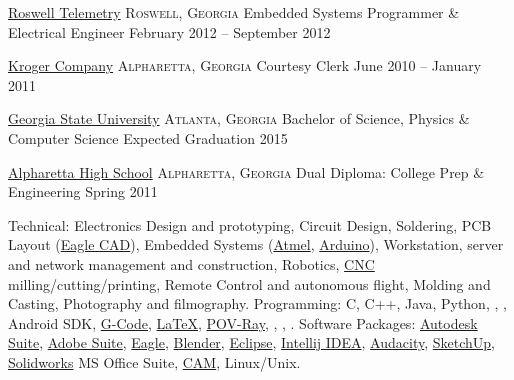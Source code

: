 \documentclass[10pt,a4paper]{article}
\begin{document}
\headedsection
  {\href{http://www.roswelltelemetry.com}{Roswell Telemetry}}
  {\textsc{Roswell, Georgia}} {%
  \headedsubsection
    {Embedded Systems Programmer \& Electrical Engineer}
    {February 2012 -- September 2012}
    {}
}

\headedsection
  {\href{https://www.kroger.com/}{Kroger Company}}
  {\textsc{Alpharetta, Georgia}} {%
  \headedsubsection
    {Courtesy Clerk}
    {June 2010 -- January 2011}
    {}
}


\spacedhrule{0.2em}{-0.4em}


\headedsection
  {\href{http://www.gsu.edu}{Georgia State University}}
  {\textsc{Atlanta, Georgia}} {%
  \headedsubsection
    {Bachelor of Science, Physics \& Computer Science}
    {Expected Graduation 2015}
    {}
}

\headedsection
  {\href{http://school.fultonschools.org/hs/alpharetta/pages/default.aspx}{Alpharetta High School}}
  {\textsc{Alpharetta, Georgia}} {%
  \headedsubsection
    {Dual Diploma: College Prep \& Engineering}
    {Spring 2011} {}
}

\spacedhrule{0.5em}{-0.4em}


\inlineheadsection  %
  {Technical:}
  {Electronics Design and prototyping, Circuit Design, Soldering, PCB Layout  (\href{http://www.cadsoftusa.com/}{Eagle CAD}), Embedded Systems (\href{http://www.atmel.com/}{Atmel}, \href{http://www.arduino.cc/}{Arduino}), Workstation, server and network management and construction, Robotics, \href{http://en.wikipedia.org/wiki/Numerical_control}{CNC} milling/cutting/printing, Remote Control and autonomous flight, Molding and Casting, Photography and filmography.
  }
  \vspace{0.5em}
  \inlineheadsection
  {Programming:}
  {C, C++, Java, Python, , , Android SDK, \href{http://en.wikipedia.org/wiki/G-code}{G-Code}, \href{http://www.latex-project.org}{\LaTeX}, \href{http://www.povray.org/}{POV-Ray}, , , .
  }
    \vspace{0.5em}
  \inlineheadsection
  {Software Packages:}
  {\href{http://www.autodesk.com/}{Autodesk Suite}, \href{http://www.adobe.com/}{Adobe Suite}, \href{http://www.cadsoftusa.com/}{Eagle}, \href{http://www.blender.org/}{Blender}, \href{https://www.eclipse.org/}{Eclipse}, \href{http://www.jetbrains.com/idea/}{Intellij IDEA}, \href{http://audacity.sourceforge.net/}{Audacity}, \href{http://www.sketchup.com/}{SketchUp}, \href{http://www.solidworks.com/}{Solidworks} MS Office Suite, \href{http://en.wikipedia.org/wiki/Computer-aided_manufacturing}{CAM}, Linux/Unix.}
  
\end{document}
